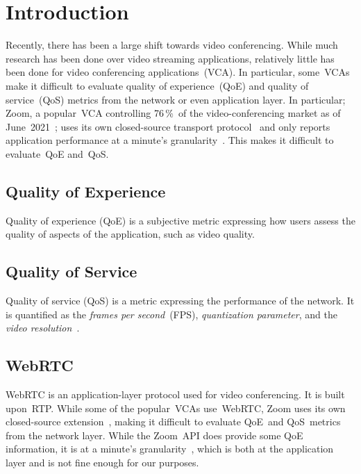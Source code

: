 \section{Introduction}\label{introduction}
    Recently, there has been a large shift towards video conferencing. While much research has been done over video streaming applications, relatively little has been done for video conferencing applications~(VCA). In particular, some~VCAs make it difficult to evaluate quality of experience~(QoE) and quality of service~(QoS) metrics from the network or even application layer. In particular; Zoom, a popular~VCA controlling 76\,\%~of the video-conferencing market as of June~2021~\autocite{kim2021}; uses its own closed-source transport protocol~\autocite{marczak2020} and only reports application performance at a minute's granularity~\autocite{walia2019}. This makes it difficult to evaluate~QoE and~QoS.

    \subsection{Quality of Experience}\label{introduction:qoe}
        Quality of experience (QoE) is a subjective metric expressing how users assess the quality of aspects of the application, such as video quality. 


    \subsection{Quality of Service}\label{introduction:qos}
        Quality of service (QoS) is a metric expressing the performance of the network. It is quantified as the \emph{frames per second}~(FPS), \emph{quantization parameter}, and the \emph{video resolution}~\autocite{MacMillanKyle2021MtPa}.

    \subsection{WebRTC}\label{introduction:webrtc}
        WebRTC is an application-layer protocol used for video conferencing. It is built upon~RTP. While some of the popular~VCAs use~WebRTC, Zoom uses its own closed-source extension~\autocite{marczak2020}, making it difficult to evaluate QoE~and QoS~metrics from the network layer. While the Zoom~API does provide some QoE information, it is at a minute's granularity~\autocite{walia2019}, which is both at the application layer and is not fine enough for our purposes.
